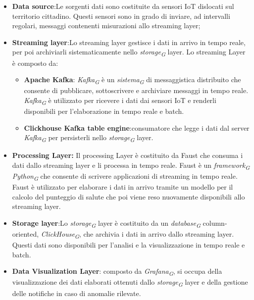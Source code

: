 \begin{itemize}
    \item \textbf{Data source}:Le sorgenti dati sono costituite da sensori IoT dislocati sul territorio cittadino. Questi sensori sono in grado di inviare, ad intervalli regolari, messaggi contenenti misurazioni allo streaming layer;
    \item \textbf{Streaming layer}:Lo streaming layer gestisce i dati in arrivo in tempo reale, per poi archiviarli sistematicamente nello \textit{storage}\textsubscript{\textit{G}} layer. Lo streaming Layer è composto da:
    \begin{itemize}
        \item \textbf{Apache Kafka}: \textit{Kafka}\textsubscript{\textit{G}} è un \textit{sistema}\textsubscript{\textit{G}} di messaggistica distribuito che consente di pubblicare, sottoscrivere e archiviare messaggi in tempo reale. \textit{Kafka}\textsubscript{\textit{G}} è utilizzato per ricevere i dati dai sensori IoT e renderli disponibili per l'elaborazione in tempo reale e batch.
        \item \textbf{Clickhouse Kafka table engine}:consumatore che legge i
        dati dal server \textit{Kafka}\textsubscript{\textit{G}} per persisterli nello \textit{storage}\textsubscript{\textit{G}} layer.
    \end{itemize}
    \item \textbf{Processing Layer:} Il processing Layer è costituito da Faust che consuma i dati dallo streaming layer e li processa in tempo reale. Faust è un \textit{framework}\textsubscript{\textit{G}} \textit{Python}\textsubscript{\textit{G}} che consente di scrivere applicazioni di streaming in tempo reale. Faust è utilizzato per elaborare i dati in arrivo tramite un modello per il calcolo del punteggio di salute che poi viene reso nuovamente disponibili allo streaming layer.
    \item \textbf{Storage layer}:Lo \textit{storage}\textsubscript{\textit{G}} layer è costituito da un \textit{database}\textsubscript{\textit{G}} column-oriented, \textit{ClickHouse}\textsubscript{\textit{G}}, che archivia i dati in arrivo dallo streaming layer. Questi dati sono disponibili per l'analisi e la visualizzazione in tempo reale e batch.
    \item \textbf{Data Visualization Layer}: composto da \textit{Grafana}\textsubscript{\textit{G}}, si occupa della visualizzazione dei dati elaborati ottenuti dallo \textit{storage}\textsubscript{\textit{G}} layer e della gestione delle notifiche in caso di anomalie rilevate.
\end{itemize}


